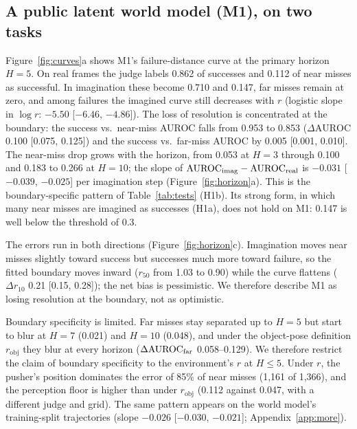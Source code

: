 \documentclass[10pt]{article}
\newcommand{\rob}{r_{\mathrm{obj}}}
\newcommand{\dauc}{\Delta\mathrm{AUROC}}
\begin{document}
\subsection{A public latent world model (M1), on two tasks}
Figure~\ref{fig:curves}a shows M1's failure-distance curve at the primary horizon $H=5$. On real frames the judge labels 0.862 of successes and 0.112 of near misses as successful. In imagination these become 0.710 and 0.147, far misses remain at zero, and among failures the imagined curve still decreases with $r$ (logistic slope in $\log r$: $-5.50$ [$-6.46$, $-4.86$]). The loss of resolution is concentrated at the boundary: the success vs.\ near-miss AUROC falls from 0.953 to 0.853 ($\dauc$ 0.100 [0.075, 0.125]) and the success vs.\ far-miss AUROC by 0.005 [0.001, 0.010]. The near-miss drop grows with the horizon, from 0.053 at $H=3$ through 0.100 and 0.183 to 0.266 at $H=10$; the slope of $\mathrm{AUROC}_{\rm imag}-\mathrm{AUROC}_{\rm real}$ is $-0.031$ [$-0.039$, $-0.025$] per imagination step (Figure~\ref{fig:horizon}a). This is the boundary-specific pattern of Table~\ref{tab:tests} (H1b). Its strong form, in which many near misses are imagined as successes (H1a), does not hold on M1: 0.147 is well below the threshold of 0.3.

The errors run in both directions (Figure~\ref{fig:horizon}c). Imagination moves near misses slightly toward success but successes much more toward failure, so the fitted boundary moves inward ($r_{50}$ from 1.03 to 0.90) while the curve flattens ($\Delta r_{10}$ 0.21 [0.15, 0.28]); the net bias is pessimistic. We therefore describe M1 as losing resolution at the boundary, not as optimistic.

Boundary specificity is limited. Far misses stay separated up to $H=5$ but start to blur at $H=7$ (0.021) and $H=10$ (0.048), and under the object-pose definition $\rob$ they blur at every horizon ($\dauc_{\rm far}$ 0.058--0.129). We therefore restrict the claim of boundary specificity to the environment's $r$ at $H\le5$. Under $r$, the pusher's position dominates the error of 85\% of near misses (1,161 of 1,366), and the perception floor is higher than under $\rob$ (0.112 against 0.047, with a different judge and grid). The same pattern appears on the world model's training-split trajectories (slope $-0.026$ [$-0.030$, $-0.021$]; Appendix~\ref{app:more}).
\end{document}

